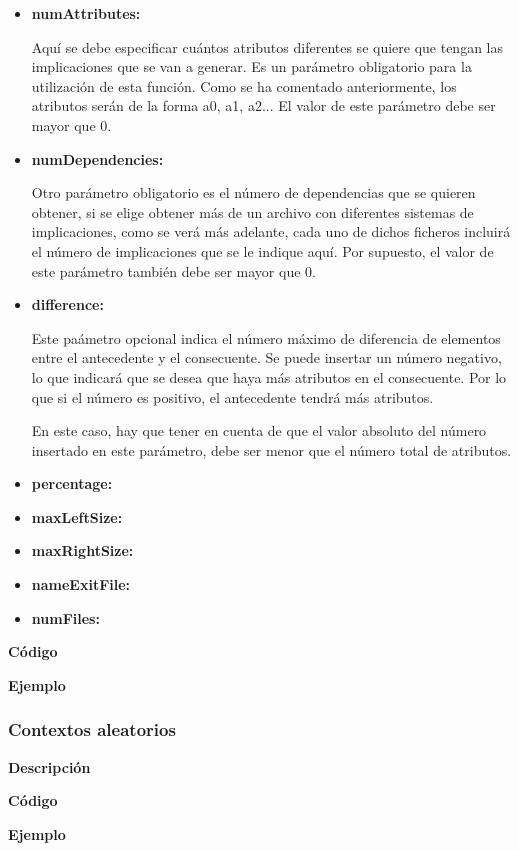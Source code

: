     \begin{itemize}
        \item \textbf{numAttributes:}

        Aqu\'i se debe especificar cu\'antos atributos diferentes se quiere que tengan las implicaciones que se van a generar. Es un 
        par\'ametro obligatorio para la utilizaci\'on de esta funci\'on. Como se ha comentado anteriormente, los atributos serán de la 
        forma a0, a1, a2... El valor de este par\'ametro debe ser mayor que 0.

        
        \item \textbf{numDependencies:}

        Otro par\'ametro obligatorio es el número de dependencias que se quieren obtener, si se elige obtener m\'as de un archivo 
        con diferentes sistemas de implicaciones, como se ver\'a m\'as adelante, cada uno de dichos ficheros incluir\'a el n\'umero 
        de implicaciones que se le indique aqu\'i. Por supuesto, el valor de este par\'ametro tambi\'en debe ser mayor que 0.


        \item \textbf{difference:}

        Este pa\'ametro opcional indica el n\'umero m\'aximo de diferencia de elementos entre el antecedente y el consecuente. Se puede 
        insertar un n\'umero negativo, lo que indicar\'a que se desea que haya m\'as atributos en el consecuente. Por lo que si el n\'umero 
        es positivo, el antecedente tendr\'a m\'as atributos.

        En este caso, hay que tener en cuenta de que el valor absoluto del n\'umero insertado en este par\'ametro, debe ser menor 
        que el n\'umero total de atributos.


        \item \textbf{percentage:}

        \item \textbf{maxLeftSize:}

        \item \textbf{maxRightSize:}

        \item \textbf{nameExitFile:}

        \item \textbf{numFiles:}



    \end{itemize}

    \textbf{C\'odigo}


    \textbf{Ejemplo}


    

\subsubsection{Contextos aleatorios}

    \textbf{Descripci\'on}

    \textbf{C\'odigo}

    \textbf{Ejemplo}